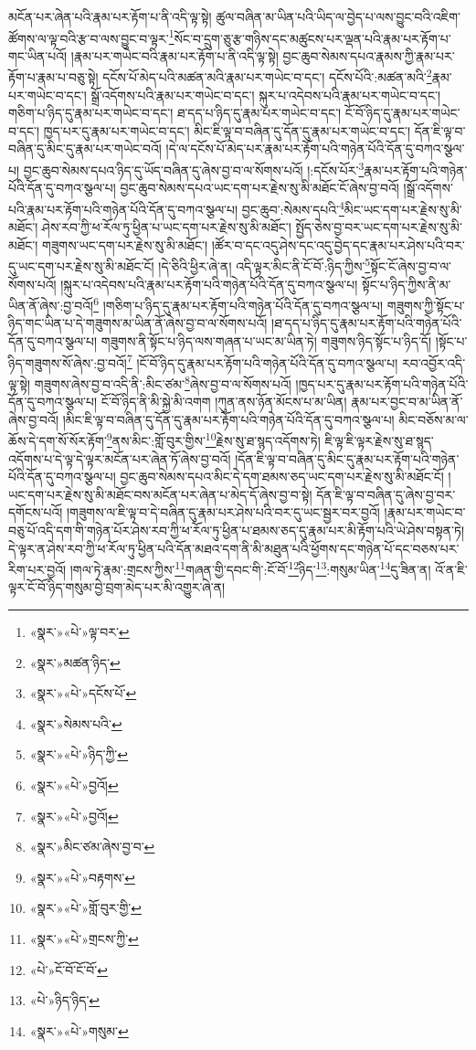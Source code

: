 མངོན་པར་ཞེན་པའི་རྣམ་པར་རྟོག་པ་ནི་འདི་ལྟ་སྟེ། ཚུལ་བཞིན་མ་ཡིན་པའི་ཡིད་ལ་བྱེད་པ་ལས་བྱུང་བའི་འཇིག་ཚོགས་ལ་ལྟ་བའི་རྩ་བ་ལས་བྱུང་བ་ལྟར་\footnote{«སྣར་»«པེ་»ལྟ་བར་}སོང་བ་དྲུག་ཅུ་རྩ་གཉིས་དང་མཚུངས་པར་ལྡན་པའི་རྣམ་པར་རྟོག་པ་གང་ཡིན་པའོ། །རྣམ་པར་གཡེང་བའི་རྣམ་པར་རྟོག་པ་ནི་འདི་ལྟ་སྟེ། བྱང་ཆུབ་སེམས་དཔའ་རྣམས་ཀྱི་རྣམ་པར་རྟོག་པ་རྣམ་པ་བཅུ་སྟེ། དངོས་པོ་མེད་པའི་མཚན་མའི་རྣམ་པར་གཡེང་བ་དང་། དངོས་པོའི་:མཚན་མའི་\footnote{«སྣར་»མཚན་ཉིད་}རྣམ་པར་གཡེང་བ་དང་། སྒྲོ་འདོགས་པའི་རྣམ་པར་གཡེང་བ་དང་། སྐུར་པ་འདེབས་པའི་རྣམ་པར་གཡེང་བ་དང་། གཅིག་པ་ཉིད་དུ་རྣམ་པར་གཡེང་བ་དང་། ཐ་དད་པ་ཉིད་དུ་རྣམ་པར་གཡེང་བ་དང་། ངོ་བོ་ཉིད་དུ་རྣམ་པར་གཡེང་བ་དང་། ཁྱད་པར་དུ་རྣམ་པར་གཡེང་བ་དང་། མིང་ཇི་ལྟ་བ་བཞིན་དུ་དོན་དུ་རྣམ་པར་གཡེང་བ་དང་། དོན་ཇི་ལྟ་བ་བཞིན་དུ་མིང་དུ་རྣམ་པར་གཡེང་བའོ། །དེ་ལ་དངོས་པོ་མེད་པར་རྣམ་པར་རྟོག་པའི་གཉེན་པོའི་དོན་དུ་བཀའ་སྩལ་པ། བྱང་ཆུབ་སེམས་དཔའ་ཉིད་དུ་ཡོད་བཞིན་དུ་ཞེས་བྱ་བ་ལ་སོགས་པའོ། །:དངོས་པོར་\footnote{«སྣར་»«པེ་»དངོས་པོ་}རྣམ་པར་རྟོག་པའི་གཉེན་པོའི་དོན་དུ་བཀའ་སྩལ་པ། བྱང་ཆུབ་སེམས་དཔའ་ཡང་དག་པར་རྗེས་སུ་མི་མཐོང་ངོ་ཞེས་བྱ་བའོ། །སྒྲོ་འདོགས་པའི་རྣམ་པར་རྟོག་པའི་གཉེན་པོའི་དོན་དུ་བཀའ་སྩལ་པ། བྱང་ཆུབ་:སེམས་དཔའི་\footnote{«སྣར་»སེམས་པའི་}མིང་ཡང་དག་པར་རྗེས་སུ་མི་མཐོང་། ཤེས་རབ་ཀྱི་ཕ་རོལ་ཏུ་ཕྱིན་པ་ཡང་དག་པར་རྗེས་སུ་མི་མཐོང་། སྤྱོད་ཅེས་བྱ་བར་ཡང་དག་པར་རྗེས་སུ་མི་མཐོང་། གཟུགས་ཡང་དག་པར་རྗེས་སུ་མི་མཐོང་། །ཚོར་བ་དང་འདུ་ཤེས་དང་འདུ་བྱེད་དང་རྣམ་པར་ཤེས་པའི་བར་དུ་ཡང་དག་པར་རྗེས་སུ་མི་མཐོང་ངོ། །དེ་ཅིའི་ཕྱིར་ཞེ་ན། འདི་ལྟར་མིང་ནི་ངོ་བོ་:ཉིད་ཀྱིས་\footnote{«སྣར་»«པེ་»ཉིད་ཀྱི་}སྟོང་ངོ་ཞེས་བྱ་བ་ལ་སོགས་པའོ། །སྐུར་པ་འདེབས་པའི་རྣམ་པར་རྟོག་པའི་གཉེན་པོའི་དོན་དུ་བཀའ་སྩལ་པ། སྟོང་པ་ཉིད་ཀྱིས་ནི་མ་ཡིན་ནོ་ཞེས་:བྱ་བའོ།\footnote{«སྣར་»«པེ་»བྱའོ།} །གཅིག་པ་ཉིད་དུ་རྣམ་པར་རྟོག་པའི་གཉེན་པོའི་དོན་དུ་བཀའ་སྩལ་པ། གཟུགས་ཀྱི་སྟོང་པ་ཉིད་གང་ཡིན་པ་དེ་གཟུགས་མ་ཡིན་ནོ་ཞེས་བྱ་བ་ལ་སོགས་པའོ། །ཐ་དད་པ་ཉིད་དུ་རྣམ་པར་རྟོག་པའི་གཉེན་པོའི་དོན་དུ་བཀའ་སྩལ་པ། གཟུགས་ནི་སྟོང་པ་ཉིད་ལས་གཞན་པ་ཡང་མ་ཡིན་ཏེ། གཟུགས་ཉིད་སྟོང་པ་ཉིད་དོ། །སྟོང་པ་ཉིད་གཟུགས་སོ་ཞེས་:བྱ་བའོ།\footnote{«སྣར་»«པེ་»བྱའོ།} །ངོ་བོ་ཉིད་དུ་རྣམ་པར་རྟོག་པའི་གཉེན་པོའི་དོན་དུ་བཀའ་སྩལ་པ། རབ་འབྱོར་འདི་ལྟ་སྟེ། གཟུགས་ཞེས་བྱ་བ་འདི་ནི་:མིང་ཙམ་\footnote{«སྣར་»མིང་ཙམ་ཞེས་བྱ་བ་}ཞེས་བྱ་བ་ལ་སོགས་པའོ། །ཁྱད་པར་དུ་རྣམ་པར་རྟོག་པའི་གཉེན་པོའི་དོན་དུ་བཀའ་སྩལ་པ། ངོ་བོ་ཉིད་ནི་མི་སྐྱེ་མི་འགག །ཀུན་ནས་ཉོན་མོངས་པ་མ་ཡིན། རྣམ་པར་བྱང་བ་མ་ཡིན་ནོ་ཞེས་བྱ་བའོ། །མིང་ཇི་ལྟ་བ་བཞིན་དུ་དོན་དུ་རྣམ་པར་རྟོག་པའི་གཉེན་པོའི་དོན་དུ་བཀའ་སྩལ་པ། མིང་བཅོས་མ་ལ་ཆོས་དེ་དག་སོ་སོར་རྟོག་\footnote{«སྣར་»«པེ་»བརྟགས་}ནས་མིང་:གློ་བུར་གྱིས་\footnote{«སྣར་»«པེ་»གློ་བུར་གྱི་}རྗེས་སུ་ཐ་སྙད་འདོགས་ཏེ། ཇི་ལྟ་ཇི་ལྟར་རྗེས་སུ་ཐ་སྙད་འདོགས་པ་དེ་ལྟ་དེ་ལྟར་མངོན་པར་ཞེན་ཏོ་ཞེས་བྱ་བའོ། །དོན་ཇི་ལྟ་བ་བཞིན་དུ་མིང་དུ་རྣམ་པར་རྟོག་པའི་གཉེན་པོའི་དོན་དུ་བཀའ་སྩལ་པ། བྱང་ཆུབ་སེམས་དཔའ་མིང་དེ་དག་ཐམས་ཅད་ཡང་དག་པར་རྗེས་སུ་མི་མཐོང་ངོ། །ཡང་དག་པར་རྗེས་སུ་མི་མཐོང་བས་མངོན་པར་ཞེན་པ་མེད་དོ་ཞེས་བྱ་བ་སྟེ། དོན་ཇི་ལྟ་བ་བཞིན་དུ་ཞེས་བྱ་བར་དགོངས་པའོ། །གཟུགས་ལ་ཇི་ལྟ་བ་དེ་བཞིན་དུ་རྣམ་པར་ཤེས་པའི་བར་དུ་ཡང་སྦྱར་བར་བྱའོ། །རྣམ་པར་གཡེང་བ་བཅུ་པོ་འདི་དག་གི་གཉེན་པོར་ཤེས་རབ་ཀྱི་ཕ་རོལ་ཏུ་ཕྱིན་པ་ཐམས་ཅད་དུ་རྣམ་པར་མི་རྟོག་པའི་ཡེ་ཤེས་བསྟན་ཏེ། དེ་ལྟར་ན་ཤེས་རབ་ཀྱི་ཕ་རོལ་ཏུ་ཕྱིན་པའི་དོན་མཐའ་དག་ནི་མི་མཐུན་པའི་ཕྱོགས་དང་གཉེན་པོ་དང་བཅས་པར་རིག་པར་བྱའོ། །གལ་ཏེ་རྣམ་:གྲངས་ཀྱིས་\footnote{«སྣར་»«པེ་»གྲངས་ཀྱི་}གཞན་གྱི་དབང་གི་:ངོ་བོ་\footnote{«པེ་»ངོ་བོ་ངོ་བོ་}ཉིད་\footnote{«པེ་»ཉིད་ཉིད་}:གསུམ་ཡིན་\footnote{«སྣར་»«པེ་»གསུམ་}དུ་ཟིན་ན། འོ་ན་ཇི་ལྟར་ངོ་བོ་ཉིད་གསུམ་བྱེ་བྲག་མེད་པར་མི་འགྱུར་ཞེ་ན། 